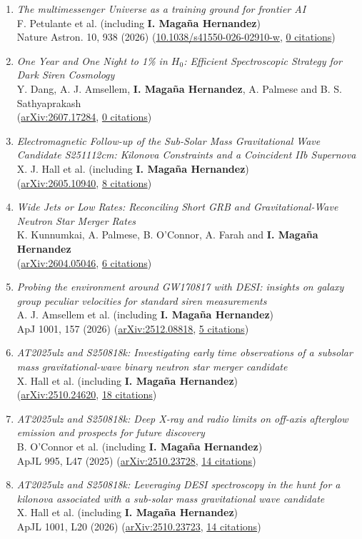\documentclass[letterpaper,10pt]{article}
\newcommand{\publicationArxiv}[5]{%
\emph{#1}\\
#2\\
(\href{#3}{#4}, \underline{#5 citations})}
\newcommand{\publicationJournal}[6]{%
\emph{#1}\\
#2\\
#3 (\href{#4}{#5}, \underline{#6 citations})}
\begin{document}
\begin{enumerate}
\item
    \publicationJournal{The multimessenger Universe as a training ground for frontier AI}
    {F. Petulante et al. (including \textbf{I. Maga\~na Hernandez})}
    {Nature Astron. 10, 938 (2026)}{https://doi.org/10.1038/s41550-026-02910-w}{10.1038/s41550-026-02910-w}{0}
\item
    \publicationArxiv{One Year and One Night to 1\% in $H_0$: Efficient Spectroscopic Strategy for Dark Siren Cosmology}
    {Y. Dang, A. J. Amsellem, \textbf{I. Maga\~na Hernandez}, A. Palmese and B. S. Sathyaprakash}
    {https://arxiv.org/abs/2607.17284}{arXiv:2607.17284}{0}
\item
    \publicationArxiv{Electromagnetic Follow-up of the Sub-Solar Mass Gravitational Wave Candidate S251112cm: Kilonova Constraints and a Coincident IIb Supernova}
    {X. J. Hall et al. (including \textbf{I. Maga\~na Hernandez})}
    {https://arxiv.org/abs/2605.10940}{arXiv:2605.10940}{8}
\item
    \publicationArxiv{Wide Jets or Low Rates: Reconciling Short GRB and Gravitational-Wave Neutron Star Merger Rates}
    {K. Kunnumkai, A. Palmese, B. O'Connor, A. Farah and \textbf{I. Maga\~na Hernandez}}
    {https://arxiv.org/abs/2604.05046}{arXiv:2604.05046}{6}
\item
    \publicationJournal{Probing the environment around GW170817 with DESI: insights on galaxy group peculiar velocities for standard siren measurements}
    {A. J. Amsellem et al. (including \textbf{I. Maga\~na Hernandez})}
    {ApJ 1001, 157 (2026)}{https://arxiv.org/abs/2512.08818}{arXiv:2512.08818}{5}
\item
    \publicationArxiv{AT2025ulz and S250818k: Investigating early time observations of a subsolar mass gravitational-wave binary neutron star merger candidate}
    {X. Hall et al. (including \textbf{I. Maga\~na Hernandez})}
    {https://arxiv.org/abs/2510.24620}{arXiv:2510.24620}{18}
\item
    \publicationJournal{AT2025ulz and S250818k: Deep X-ray and radio limits on off-axis afterglow emission and prospects for future discovery
}{B. O'Connor et al. (including \textbf{I. Maga\~na Hernandez})}{ApJL 995, L47 (2025)}
    {https://arxiv.org/abs/2510.23728}{arXiv:2510.23728}{14}
\item
    \publicationJournal{AT2025ulz and S250818k: Leveraging DESI spectroscopy in the hunt for a kilonova associated with a sub-solar mass gravitational wave candidate}{X. Hall et al. (including \textbf{I. Maga\~na Hernandez})}{ApJL 1001, L20 (2026)}{https://arxiv.org/abs/2510.23723}{arXiv:2510.23723}{14}

\end{enumerate}
\end{document}
